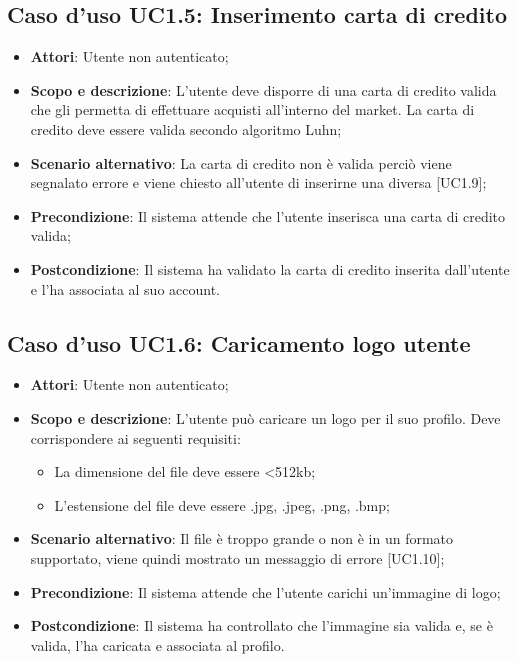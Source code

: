 \documentclass[12pt,a4paper,titlepage]{article}
\begin{document}
	\subsection{Caso d'uso UC1.5: Inserimento carta di credito}
	\label{UC1.5}
	\begin{itemize}
		\item \textbf{Attori}: Utente non autenticato;
		\item \textbf{Scopo e descrizione}: L'utente deve disporre di una carta di credito valida che gli permetta di effettuare acquisti all'interno del market. La carta di credito deve essere valida secondo algoritmo Luhn;
		\item \textbf{Scenario alternativo}: La carta di credito non è valida perciò viene segnalato errore e viene chiesto all'utente di inserirne una diversa [UC1.9];
		\item \textbf{Precondizione}: Il sistema attende che l'utente inserisca una carta di credito valida;
		\item \textbf{Postcondizione}: Il sistema ha validato la carta di credito inserita dall'utente e l'ha associata al suo account.
	\end{itemize}
	\subsection{Caso d'uso UC1.6: Caricamento logo utente}
	\label{UC1.6}
	\begin{itemize}
		\item \textbf{Attori}: Utente non autenticato;
		\item \textbf{Scopo e descrizione}: L'utente può caricare un logo per il suo profilo. Deve corrispondere ai seguenti requisiti:
		\begin{itemize}
			\item La dimensione del file deve essere <512kb;
			\item L'estensione del file deve essere .jpg, .jpeg, .png, .bmp;
		\end{itemize}
		\item \textbf{Scenario alternativo}: Il file è troppo grande o non è in un formato supportato, viene quindi mostrato un messaggio di errore [UC1.10];
		\item \textbf{Precondizione}: Il sistema attende che l'utente carichi un'immagine di logo;
		\item \textbf{Postcondizione}: Il sistema ha controllato che l'immagine sia valida e, se è valida, l'ha caricata e associata al profilo.
	\end{itemize}
\end{document}
